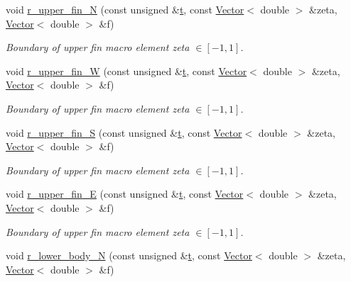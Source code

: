 \begin{DoxyCompactItemize}
void \hyperlink{classoomph_1_1FishDomain_a6b0cc31071869ef0e4b4794fe5a46d2f}{r\+\_\+upper\+\_\+fin\+\_\+N} (const unsigned \&\hyperlink{cfortran_8h_af6f0bd3dc13317f895c91323c25c2b8f}{t}, const \hyperlink{classoomph_1_1Vector}{Vector}$<$ double $>$ \&zeta, \hyperlink{classoomph_1_1Vector}{Vector}$<$ double $>$ \&f)
\begin{DoxyCompactList}\small\item\em Boundary of upper fin macro element zeta $ \in [-1,1] $. \end{DoxyCompactList}\item 
void \hyperlink{classoomph_1_1FishDomain_a750c0daa893d08038a52fbf20a4b23b8}{r\+\_\+upper\+\_\+fin\+\_\+W} (const unsigned \&\hyperlink{cfortran_8h_af6f0bd3dc13317f895c91323c25c2b8f}{t}, const \hyperlink{classoomph_1_1Vector}{Vector}$<$ double $>$ \&zeta, \hyperlink{classoomph_1_1Vector}{Vector}$<$ double $>$ \&f)
\begin{DoxyCompactList}\small\item\em Boundary of upper fin macro element zeta $ \in [-1,1] $. \end{DoxyCompactList}\item 
void \hyperlink{classoomph_1_1FishDomain_acd62f651648d85a79e04ced3193c3a2a}{r\+\_\+upper\+\_\+fin\+\_\+S} (const unsigned \&\hyperlink{cfortran_8h_af6f0bd3dc13317f895c91323c25c2b8f}{t}, const \hyperlink{classoomph_1_1Vector}{Vector}$<$ double $>$ \&zeta, \hyperlink{classoomph_1_1Vector}{Vector}$<$ double $>$ \&f)
\begin{DoxyCompactList}\small\item\em Boundary of upper fin macro element zeta $ \in [-1,1] $. \end{DoxyCompactList}\item 
void \hyperlink{classoomph_1_1FishDomain_a063912bd40138bb84b3cdfc23133eff2}{r\+\_\+upper\+\_\+fin\+\_\+E} (const unsigned \&\hyperlink{cfortran_8h_af6f0bd3dc13317f895c91323c25c2b8f}{t}, const \hyperlink{classoomph_1_1Vector}{Vector}$<$ double $>$ \&zeta, \hyperlink{classoomph_1_1Vector}{Vector}$<$ double $>$ \&f)
\begin{DoxyCompactList}\small\item\em Boundary of upper fin macro element zeta $ \in [-1,1] $. \end{DoxyCompactList}\item 
void \hyperlink{classoomph_1_1FishDomain_a75131ac72e23d5b1d701b588c0596b5d}{r\+\_\+lower\+\_\+body\+\_\+N} (const unsigned \&\hyperlink{cfortran_8h_af6f0bd3dc13317f895c91323c25c2b8f}{t}, const \hyperlink{classoomph_1_1Vector}{Vector}$<$ double $>$ \&zeta, \hyperlink{classoomph_1_1Vector}{Vector}$<$ double $>$ \&f)

\end{DoxyCompactItemize}
